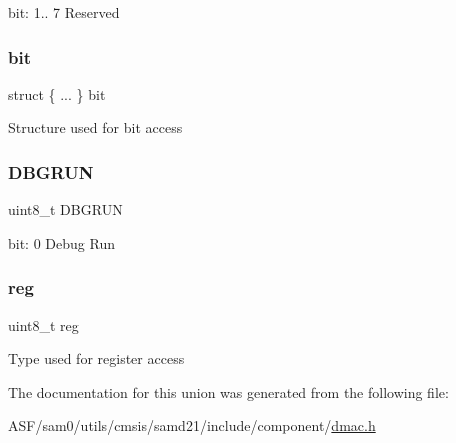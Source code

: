 bit\+: 1.. 7 Reserved \mbox{\label{union_d_m_a_c___d_b_g_c_t_r_l___type_a5f2b1ec0da0c69e8a766987d8741e5af}} 
\subsubsection{\texorpdfstring{bit}{bit}}
{\footnotesize\ttfamily struct \{ ... \}   bit}

Structure used for bit access \mbox{\label{union_d_m_a_c___d_b_g_c_t_r_l___type_a1e1cc79f6834369b9dd0c6676a0d8781}} 
\subsubsection{\texorpdfstring{DBGRUN}{DBGRUN}}
{\footnotesize\ttfamily uint8\+\_\+t D\+B\+G\+R\+UN}

bit\+: 0 Debug Run \mbox{\label{union_d_m_a_c___d_b_g_c_t_r_l___type_a9428adc9af4653a2050e2536b55dec8d}} 
\subsubsection{\texorpdfstring{reg}{reg}}
{\footnotesize\ttfamily uint8\+\_\+t reg}

Type used for register access 

The documentation for this union was generated from the following file\+:\begin{DoxyCompactItemize}
\item 
A\+S\+F/sam0/utils/cmsis/samd21/include/component/\mbox{\hyperlink{component_2dmac_8h}{dmac.\+h}}\end{DoxyCompactItemize}
